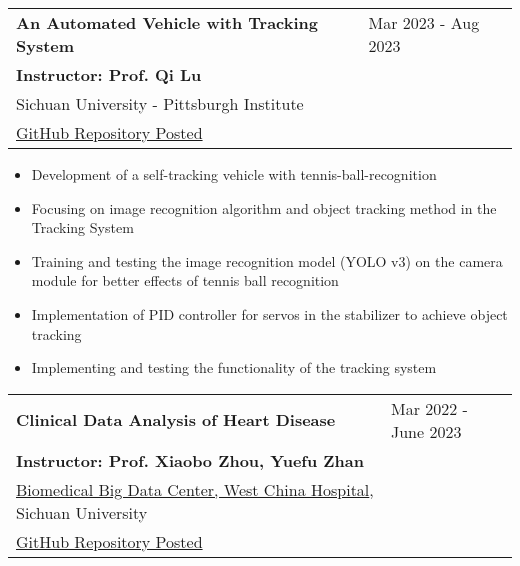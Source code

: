 \documentclass[letter,12pt]{article}
\begin{document}
\begin{tabularx}{\linewidth}{@{}l X@{}}
\large \textbf{An Automated Vehicle with Tracking System} & \hfill Mar 2023 - Aug 2023 \\
\small \textbf{Instructor: Prof. Qi Lu} & \hfill {} \\
\small{{Sichuan University - Pittsburgh Institute}} & \hfill {} \\
\small{\href{https://github.com/Robin0265/StablerCTRL}{GitHub Repository Posted}} & \hfill {} \\
\end{tabularx}

\begin{itemize}[
    rightmargin=2cm
]
    \setlength{\itemsep}{1pt}
    \setlength{\parskip}{0pt}
    \setlength{\parsep}{0pt}
    \item{\small Development of a self-tracking vehicle with tennis-ball-recognition}
    \item{\small Focusing on image recognition algorithm and object tracking method in the Tracking System}
    \item{\small Training and testing the image recognition model (YOLO v3) on the camera module for better effects of tennis ball recognition}
    \item{\small Implementation of PID controller for servos in the stabilizer to achieve object tracking}
    \item{\small Implementing and testing the functionality of the tracking system}
\end{itemize}

\begin{tabularx}{\linewidth}{@{}l X@{}}
\large \textbf{Clinical Data Analysis of Heart Disease} & \hfill {Mar 2022 - June 2023} \\

\textbf{Instructor: Prof. Xiaobo Zhou, Yuefu Zhan} & \hfill {}\\

\small{\href{https://www.wchscu.cn/dsj/index.html}{Biomedical Big Data Center, West China Hospital}, Sichuan University} & \hfill {} \\
\small{\href{https://github.com/Robin0265/HeartDisease_Regression}{GitHub Repository Posted}} & \hfill {} \\
\end{tabularx}
\end{document}
